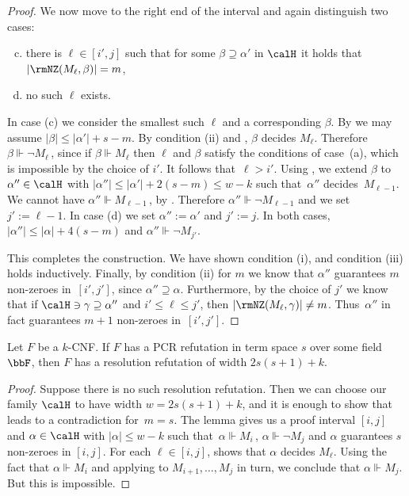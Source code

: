 \documentclass{toc}
\begin{document}
\begin{proof}
We now move to the right end of the interval and 
again distinguish two cases:
\begin{enumerate}[(a)]\setcounter{enumi}{2}
\item there is $\ell \in [i',j]$ such that for some $\beta \supseteq \alpha'$ 
in $\calH$ it holds that $|\rmNZ(M_\ell, \beta)| = m$,
\item no such $\ell$ exists.
\end{enumerate}
In case (c) we consider the smallest such $\ell$ and a corresponding $\beta$.
By  we may assume $|\beta| \le |\alpha'|+s-m$.
By condition (ii) and , $\beta$ decides $M_{\ell}$.
Therefore $\beta \Vdash \neg M_{\ell}$\,, since if 
$\beta \Vdash M_{\ell}$ then $\ell$ and $\beta$ satisfy the conditions
of case~(a), which is impossible by the choice of $i'$.
It follows that~$\ell > i'$. 
Using , we extend $\beta$
to $\alpha'' \in \calH$ with $|\alpha''| \le |\alpha'| + 2(s-m) \le w-k$ 
such that~$\alpha''$ decides~$M_{\ell - 1}$.
We cannot have $\alpha'' \Vdash M_{\ell-1}$\,, by . 
Therefore $\alpha'' \Vdash \neg M_{\ell-1}$
and we set $j' := \ell -1$.
In case (d) we set $\alpha'' :=\alpha'$ and  $j' := j$. 
In both cases, $|\alpha''| \le |\alpha| + 4(s-m)$ and $\alpha'' \Vdash \neg M_{j'}$.


This completes the construction. We have shown condition (i),
and condition (iii) holds inductively. 
Finally, by condition (ii) for $m$ we know that $\alpha''$
guarantees $m$ non-zeroes in~$[i',j']$, since $\alpha'' \supseteq \alpha$.
Furthermore,
by the choice of $j'$ we know that if $\calH \ni \gamma \supseteq \alpha''$ and $i' \le \ell \le j'$, then
$|\rmNZ(M_{\ell}, \gamma)| \neq m$. 
Thus~$\alpha''$ in fact guarantees $m+1$ non-zeroes in~$[i',j']$.
\end{proof}



\begin{theorem} \label{thm:first}
Let $F$ be a $k$-CNF. If $F$ has a PCR refutation in term
space $s$ 
over some field~$\bbF$, 
then $F$ has a resolution refutation of width $2s(s+1)+k$. 
\end{theorem}

\begin{proof}
Suppose there is no such resolution refutation. Then 
we can choose our family $\calH$ to have width $w=2s(s+1)+k$,
and it is enough to show that  leads to a contradiction
for~$m=s$. The lemma gives us 
a proof interval $[i, j]$
and $\alpha \in \calH$
with $|\alpha| \le w-k$ such that~$\alpha \Vdash M_i$\,, $\alpha \Vdash \neg M_j$
and $\alpha$ guarantees $s$ non-zeroes in $[i,j]$. 
For each $\ell \in[i, j]$,
shows that
$\alpha$ decides $M_\ell$. Using the fact that $\alpha \Vdash M_i$ and applying  to $M_{i+1}, \dots, M_j$ in turn, 
we conclude that $\alpha \Vdash M_j$. But this is impossible.
\end{proof}
\end{document}
